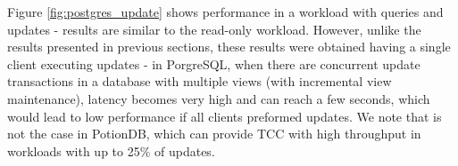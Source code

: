 \documentclass[sigplan,twocolumn,review,anonymous]{acmart}
\begin{document}
Figure \ref{fig:postgres_update} shows performance in a workload with queries and updates - results are similar to
the read-only workload. 
However, unlike the results presented in previous sections, these results were obtained having a single client executing
updates - in PorgreSQL, when there are concurrent update transactions in a database with multiple views (with incremental view maintenance), 
latency becomes very high and can reach a few seconds, which would lead to low performance if all clients preformed updates. 
We note that is not the case in PotionDB, which can provide TCC with high throughput in workloads with up to 25\% of updates.



\end{document}
